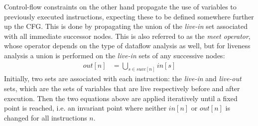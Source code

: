 \documentclass{article}
\begin{document}
Control-flow constraints on the other hand propagate the use of variables to previously executed instructions, expecting these to be defined somewhere further up the CFG. This is done by propagating the union of the \textit{live-in} set associated with all immediate successor nodes. This is also referred to as the \textit{meet operator}, whose operator depends on the type of dataflow analysis as well, but for liveness analysis a union is performed on the \textit{live-in} sets of  any successive  nodes:
\begin{align}\label{flowout}
  \mathit{out}\left[n\right] &= \bigcup_{s\in \mathit{succ}\left[n\right]} \mathit{in}\left[s\right]
\end{align}
Initially, two sets are associated with each instruction: the \textit{live-in} and \textit{live-out} sets, which are the sets of variables that are live respectively before and after execution. Then the two equations above are applied iteratively until a fixed point is reached, i.e. an invariant point where neither \(\mathit{in}[n]\) or \(\mathit{out}[n]\) is changed for all instructions \(n\).






\end{document}
